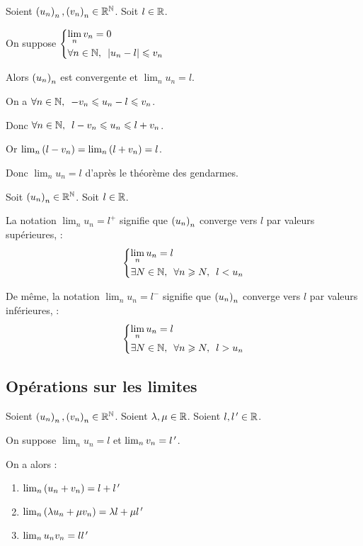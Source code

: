 \begin{cor}
Soient \(\left(u_n\right)_n,\left(v_n\right)_n\in\mathbb{R}^{\mathbb{N}}\). Soit \(l\in\mathbb{R}\).

On suppose \(\begin{dcases}\lim_nv_n=0 \\ \quantifs{\forall n\in\N}\abs{u_n-l}\leq v_n\end{dcases}\)

Alors \(\left(u_n\right)_n\) est convergente et \(\lim_nu_n=l\).
\end{cor}

\begin{dem}
On a \(\quantifs{\forall n\in\N}-v_n\leq u_n-l\leq v_n\).

Donc \(\quantifs{\forall n\in\N}l-v_n\leq u_n\leq l+v_n\).

Or \(\lim_n\left(l-v_n\right)=\lim_n\left(l+v_n\right)=l\).

Donc \(\lim_nu_n=l\) d'après le théorème des gendarmes.
\end{dem}

\begin{nota}
Soit \(\left(u_n\right)_n\in\mathbb{R}^{\mathbb{N}}\). Soit \(l\in\mathbb{R}\).

La notation \(\lim_nu_n=l^+\) signifie que \(\left(u_n\right)_n\) converge vers \(l\) par valeurs supérieures, \cad : \[\begin{dcases}\lim_nu_n=l \\ \quantifs{\exists N\in\N;\forall n\geq N}l<u_n\end{dcases}\]

De même, la notation \(\lim_nu_n=l^-\) signifie que \(\left(u_n\right)_n\) converge vers \(l\) par valeurs inférieures, \cad : \[\begin{dcases}\lim_nu_n=l \\ \quantifs{\exists N\in\N;\forall n\geq N}l>u_n\end{dcases}\]
\end{nota}

\subsection{Opérations sur les limites}

\begin{prop}
Soient \(\left(u_n\right)_n,\left(v_n\right)_n\in\mathbb{R}^{\mathbb{N}}\). Soient \(\lambda,\mu\in\mathbb{R}\). Soient \(l,l^{\,\prime}\in\mathbb{R}\).

On suppose \(\lim_nu_n=l\) et \(\lim_nv_n=l^{\,\prime}\).

On a alors :

\begin{enumerate}
\item \(\lim_n\left(u_n+v_n\right)=l+l^{\,\prime}\) \\
\item \(\lim_n\left(\lambda u_n+\mu v_n\right)=\lambda l+\mu l^{\,\prime}\) \\
\item \(\lim_nu_nv_n=ll^{\,\prime}\)
\end{enumerate}
\end{prop}

